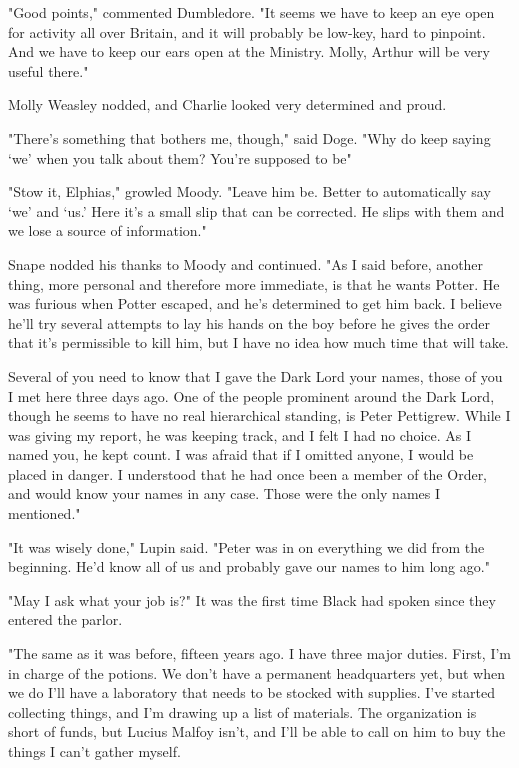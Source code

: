 "Good points," commented Dumbledore. "It seems we have to keep an eye open for activity all over Britain, and it will probably be low-key, hard to pinpoint. And we have to keep our ears open at the Ministry. Molly, Arthur will be very useful there."

Molly Weasley nodded, and Charlie looked very determined and proud.

"There's something that bothers me, though," said Doge. "Why do keep saying `we' when you talk about them? You're supposed to be{\el}"

"Stow it, Elphias," growled Moody. "Leave him be. Better to automatically say `we' and `us.' Here it's a small slip that can be corrected. He slips with them and we lose a source of information."

Snape nodded his thanks to Moody and continued. "As I said before, another thing, more personal and therefore more immediate, is that he wants Potter. He was furious when Potter escaped, and he's determined to get him back. I believe he'll try several attempts to lay his hands on the boy before he gives the order that it's permissible to kill him, but I have no idea how much time that will take.

\textooquote Several of you need to know that I gave the Dark Lord your names, those of you I met here three days ago. One of the people prominent around the Dark Lord, though he seems to have no real hierarchical standing, is Peter Pettigrew. While I was giving my report, he was keeping track, and I felt I had no choice. As I named you, he kept count. I was afraid that if I omitted anyone, I would be placed in danger. I understood that he had once been a member of the Order, and would know your names in any case. Those were the only names I mentioned."

"It was wisely done," Lupin said. "Peter was in on everything we did from the beginning. He'd know all of us and probably gave our names to{\el} him long ago."

"May I ask what your job is?" It was the first time Black had spoken since they entered the parlor.

"The same as it was before, fifteen years ago. I have three major duties. First, I'm in charge of the potions. We don't have a permanent headquarters yet, but when we do I'll have a laboratory that needs to be stocked with supplies. I've started collecting things, and I'm drawing up a list of materials. The organization is short of funds, but Lucius Malfoy isn't, and I'll be able to call on him to buy the things I can't gather myself.

